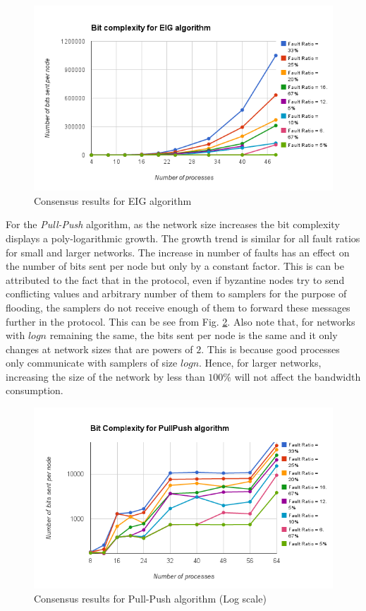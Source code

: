 \begin{figure}[ht]
 \centering
\includegraphics[scale=0.4]{eignolog}
\caption{Consensus results for EIG algorithm}
 \label{fig:eignolog}
\end{figure}
For the \textit{Pull-Push} algorithm, as the network size increases the bit complexity displays a poly-logarithmic growth. The growth trend is similar for all fault ratios for small and larger networks. The increase in number of faults has an effect on the number of bits sent per node but only by a constant factor. This is can be attributed to the fact that in the protocol, even if byzantine nodes try to send conflicting values and arbitrary number of them to samplers for the purpose of flooding, the samplers do not receive enough of them to forward these messages further in the protocol. This can be see from Fig. \ref{fig:pull_push}. Also note that, for networks with $logn$ remaining the same, the bits sent per node is the same and it only changes at network sizes that are powers of $2$. This is because good processes only communicate with samplers of size $logn$. Hence, for larger networks, increasing the size of the network by less than $100\%$ will not affect the bandwidth consumption.
\begin{figure}[ht]
 \centering
\includegraphics[scale=0.4]{pull_push}
\caption{Consensus results for Pull-Push algorithm (Log scale)}
 \label{fig:pull_push}
\end{figure}

